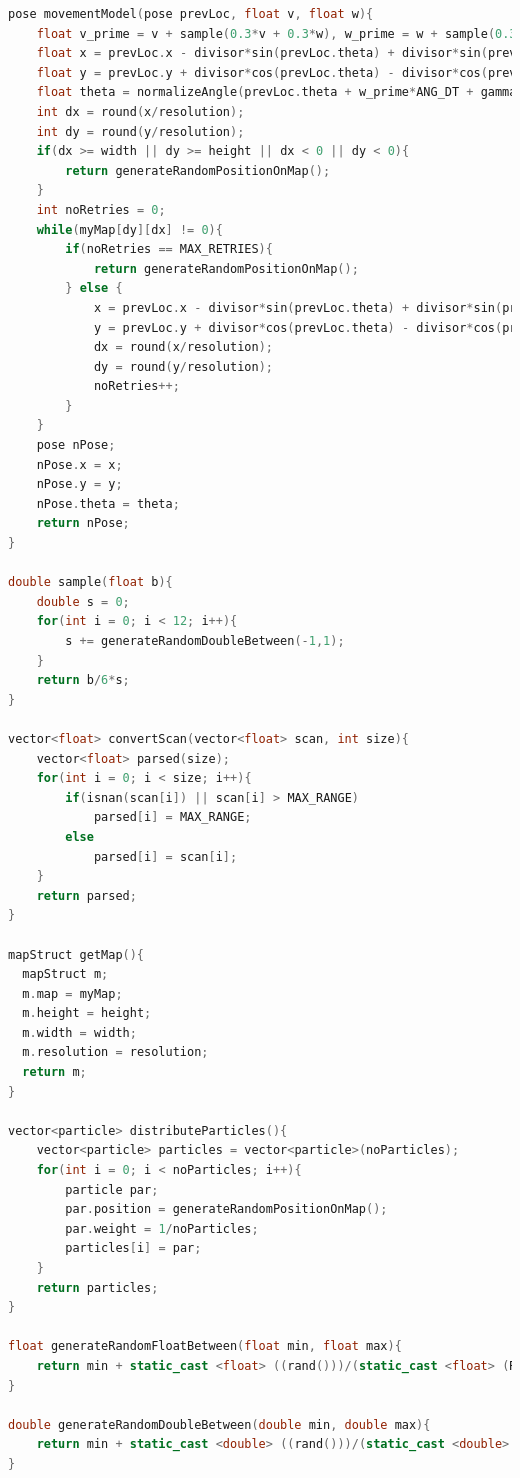 \documentclass{article}
\begin{document}
\begin{appendices}
\begin{lstlisting}[language=C++]
pose movementModel(pose prevLoc, float v, float w){
	float v_prime = v + sample(0.3*v + 0.3*w), w_prime = w + sample(0.3*v+0.3*w), gamma = sample(0.05*v+0.05*w), divisor = v_prime/w_prime;
	float x = prevLoc.x - divisor*sin(prevLoc.theta) + divisor*sin(prevLoc.theta + w_prime*LIN_DT);
	float y = prevLoc.y + divisor*cos(prevLoc.theta) - divisor*cos(prevLoc.theta + w_prime*LIN_DT);
	float theta = normalizeAngle(prevLoc.theta + w_prime*ANG_DT + gamma*ANG_DT);
	int dx = round(x/resolution);
	int dy = round(y/resolution);
	if(dx >= width || dy >= height || dx < 0 || dy < 0){
		return generateRandomPositionOnMap();
	}	
	int noRetries = 0;
	while(myMap[dy][dx] != 0){
		if(noRetries == MAX_RETRIES){
			return generateRandomPositionOnMap();
		} else {
			x = prevLoc.x - divisor*sin(prevLoc.theta) + divisor*sin(prevLoc.theta + w_prime*LIN_DT);
			y = prevLoc.y + divisor*cos(prevLoc.theta) - divisor*cos(prevLoc.theta + w_prime*LIN_DT);
			dx = round(x/resolution);
			dy = round(y/resolution);
			noRetries++;
		}
	}
	pose nPose;
	nPose.x = x;
	nPose.y = y;
	nPose.theta = theta;
	return nPose;
}

double sample(float b){
	double s = 0;
	for(int i = 0; i < 12; i++){
		s += generateRandomDoubleBetween(-1,1);
	}
	return b/6*s;
}

vector<float> convertScan(vector<float> scan, int size){
	vector<float> parsed(size);
	for(int i = 0; i < size; i++){
		if(isnan(scan[i]) || scan[i] > MAX_RANGE)
			parsed[i] = MAX_RANGE;
		else
			parsed[i] = scan[i];
	}
	return parsed;
}

mapStruct getMap(){
  mapStruct m;
  m.map = myMap;
  m.height = height;
  m.width = width;
  m.resolution = resolution;
  return m;
}

vector<particle> distributeParticles(){
	vector<particle> particles = vector<particle>(noParticles);
	for(int i = 0; i < noParticles; i++){
		particle par;
		par.position = generateRandomPositionOnMap();
		par.weight = 1/noParticles;
		particles[i] = par;
	}
	return particles;
}

float generateRandomFloatBetween(float min, float max){
	return min + static_cast <float> ((rand()))/(static_cast <float> (RAND_MAX/(max-min)));
}

double generateRandomDoubleBetween(double min, double max){
	return min + static_cast <double> ((rand()))/(static_cast <double> (RAND_MAX/(max-min)));
}


\end{lstlisting}
\end{appendices}
\end{document}
